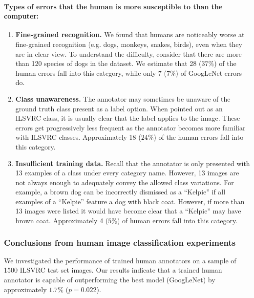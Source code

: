\paragraph{Types of errors that the human is more susceptible to than the computer:}

\begin{enumerate}

\item \textbf{Fine-grained recognition.} We found that humans are noticeably worse at fine-grained recognition (e.g. dogs, monkeys, snakes, birds), even when they are in clear view. To understand the difficulty, consider that there are more than 120 species of dogs in the dataset. We estimate that 28 ($37\%$) of the human errors fall into this category, while only 7 ($7\%$) of GoogLeNet errors do.

\item \textbf{Class unawareness.} The annotator may sometimes be unaware of the ground truth class present as a label option. When pointed out as an ILSVRC class, it is usually clear that the label applies to the image. These errors get progressively less frequent as the annotator becomes more familiar with ILSVRC classes. Approximately 18 ($24\%$) of the human errors fall into this category.

\item \textbf{Insufficient training data.} Recall that the annotator is only presented with 13 examples of a class under every category name. However, 13 images are not always enough to adequately convey the allowed class variations. For example, a brown dog can be incorrectly dismissed as a ``Kelpie'' if all examples of a ``Kelpie'' feature a dog with black coat. However, if more than 13 images were listed it would have become clear that a ``Kelpie'' may have brown coat. Approximately 4 ($5\%$) of human errors fall into this category.

\end{enumerate}

\subsubsection{Conclusions from human image classification experiments} 

We investigated the performance of trained human annotators on a sample of 1500 ILSVRC test set images. Our results indicate that a trained human annotator is capable of outperforming the best model (GoogLeNet) by approximately $1.7\%$ ($p = 0.022$). 

